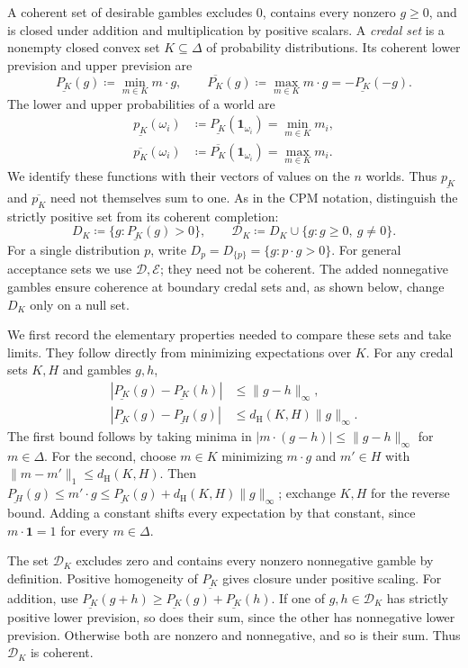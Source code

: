 \documentclass[11pt]{article}
\theoremstyle{remark}
\newcommand{\one}{\mathbf 1}
\newcommand{\dH}{d_{\mathrm H}}
\newcommand{\Dscr}{\mathcal D}
\newcommand{\Escr}{\mathcal E}
\newcommand{\lpr}[1]{\underline{P_{#1}}}
\newcommand{\upr}[1]{\overline{P_{#1}}}
\newcommand{\lowprob}[1]{\underline{p_{#1}}}
\newcommand{\upprob}[1]{\overline{p_{#1}}}
\begin{document}
A coherent set of desirable gambles excludes $0$, contains every nonzero
$g\ge0$, and is closed under addition and multiplication by positive scalars.
A \emph{credal set} is a nonempty closed convex set $K\subseteq\Delta$ of
probability distributions. Its coherent lower prevision and upper prevision are
\[
 \lpr{K}(g)\coloneqq\min_{m\in K}m\cdot g,\qquad
 \upr{K}(g)\coloneqq\max_{m\in K}m\cdot g=-\lpr{K}(-g).
\]
The lower and upper probabilities of a world are
\[
 \begin{aligned}
 \lowprob{K}(\omega_i)&\coloneqq\lpr{K}(\one_{\omega_i})=\min_{m\in K}m_i,\\
 \upprob{K}(\omega_i)&\coloneqq\upr{K}(\one_{\omega_i})=\max_{m\in K}m_i.
 \end{aligned}
\]
We identify these functions with their vectors of values on the $n$ worlds.
Thus $\lowprob{K}$ and $\upprob{K}$ need not themselves sum to one.
As in the CPM notation, distinguish the strictly positive set from its coherent
completion:
\[
 D_K\coloneqq\{g:\lpr{K}(g)>0\},\qquad
 \Dscr_K\coloneqq D_K\cup\{g:g\ge0,\ g\ne0\}.
\]
For a single distribution $p$, write $D_p=D_{\{p\}}=\{g:p\cdot g>0\}$.
For general acceptance sets we use $\Dscr,\Escr$; they need not be coherent.
The added nonnegative gambles ensure coherence at boundary credal sets and,
as shown below, change $D_K$ only on a null set.

We first record the elementary properties needed to compare these sets and
take limits. They follow directly from minimizing expectations over $K$.
For any credal sets $K,H$ and gambles $g,h$,
\begin{equation}
 \begin{aligned}
 |\lpr{K}(g)-\lpr{K}(h)|&\le\|g-h\|_\infty,\\
 |\lpr{K}(g)-\lpr{H}(g)|&\le\dH(K,H)\|g\|_\infty.
 \end{aligned}\label{eq:phi-estimates}
\end{equation}
The first bound follows by taking minima in
$|m\cdot(g-h)|\le\|g-h\|_\infty$ for $m\in\Delta$.
For the second, choose $m\in K$ minimizing $m\cdot g$ and $m'\in H$ with
$\|m-m'\|_1\le\dH(K,H)$. Then
$\lpr{H}(g)\le m'\cdot g\le\lpr{K}(g)+\dH(K,H)\|g\|_\infty$;
exchange $K,H$ for the reverse bound. Adding a constant shifts every expectation by that constant, since
$m\cdot\one=1$ for every $m\in\Delta$.

The set $\Dscr_{K}$ excludes zero and contains every nonzero nonnegative gamble by
definition. Positive homogeneity of $\lpr{K}$ gives closure under positive
scaling. For addition, use
$\lpr{K}(g+h)\ge\lpr{K}(g)+\lpr{K}(h)$. If one of $g,h\in \Dscr_{K}$ has
strictly positive lower prevision, so does their sum, since the other has
nonnegative lower prevision. Otherwise both are nonzero and nonnegative,
and so is their sum. Thus $\Dscr_{K}$ is coherent.
\end{document}
